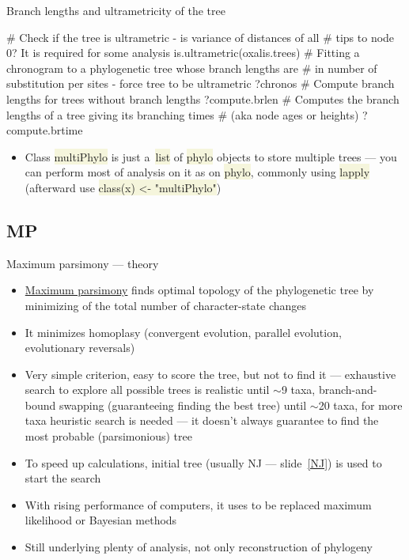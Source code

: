 \documentclass[compress, xelatex, 11pt, xcolor=svgnames, aspectratio=169, url={hyphens, lowtilde}]{beamer}
\renewcommand{\texttt}[1]{\colorbox{Beige}{{\ttfamily #1}}}
\begin{document}
\begin{frame}[fragile]{Branch lengths and ultrametricity of the tree}
	\begin{spluscode}
    # Check if the tree is ultrametric - is variance of distances of all
    # tips to node 0? It is required for some analysis
    is.ultrametric(oxalis.trees)
    # Fitting a chronogram to a phylogenetic tree whose branch lengths are
    # in number of substitution per sites - force tree to be ultrametric
    ?chronos
    # Compute branch lengths for trees without branch lengths
    ?compute.brlen
    # Computes the branch lengths of a tree giving its branching times
    # (aka node ages or heights)
    ?compute.brtime
	\end{spluscode}
	\begin{itemize}
		\item Class \texttt{multiPhylo} is just a~\texttt{list} of \texttt{phylo} objects to store multiple trees --- you can perform most of analysis on it as on \texttt{phylo}, commonly using \texttt{lapply} (afterward use \texttt{class(x) <- "multiPhylo"})
	\end{itemize}
\end{frame}

\subsection{MP}

\begin{frame}{Maximum parsimony --- theory}
	\label{MP}
	\begin{itemize}
		\item \href{https://en.wikipedia.org/wiki/Maximum_parsimony}{Maximum parsimony} finds optimal topology of the phylogenetic tree by minimizing of the total number of character-state changes
		\item It minimizes homoplasy (convergent evolution, parallel evolution, evolutionary reversals)
		\item Very simple criterion, easy to score the tree, but not to find it --- exhaustive search to explore all possible trees is realistic until $\sim$9 taxa, branch-and-bound swapping (guaranteeing finding the best tree) until $\sim$20 taxa, for more taxa heuristic search is needed --- it doesn't always guarantee to find the most probable (parsimonious) tree
		\item To speed up calculations, initial tree (usually NJ --- slide~\ref{NJ}) is used to start the search
		\item With rising performance of computers, it uses to be replaced maximum likelihood or Bayesian methods
		\item Still underlying plenty of analysis, not only reconstruction of phylogeny
	\end{itemize}
\end{frame}
\end{document}
